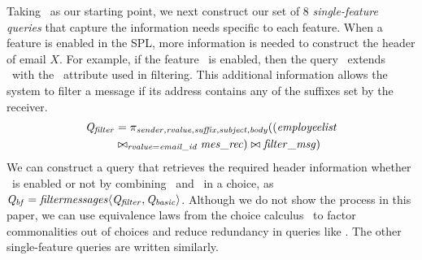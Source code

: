 Taking \Qbasic\ as our starting point, we next construct our set of $8$
\emph{single-feature queries} that capture the information needs specific to
each feature.
%
When a feature is enabled in the SPL, more information is needed to construct
the header of email $X$. For example, if the feature \filtermessages\ is
enabled, then the query \Qfilter\ extends \Qbasic\ with the \suffix\ attribute
used in filtering. This additional information allows the system to filter a
message if its address contains any of the suffixes set by the receiver.
%
%
\vspace{-2pt}
\begin{align*}
\Qfilter &= 
\pi_{\sender,\rvalue,\suffix,\subject,\body}
((\employees \\
&\bowtie_{\rvalue=\emailid}
 \mrtable) \bowtie\filtermsg )
\end{align*}
\vspace{-1pt}
%
%
We can construct a query that retrieves the required header information whether
\filtermessages\ is enabled or not by combining \Qbasic\ and \Qfilter\ in a
choice, as $\Qbf=\chc[\filtermessages]{\Qfilter,\Qbasic}$. 
%
Although we do not show the process in this paper, we can use equivalence laws
from the choice calculus~\cite{EW11tosem,HW16fosd} to factor commonalities out
of choices and reduce redundancy in queries like \Qbf.
The other single-feature queries are written similarly.



